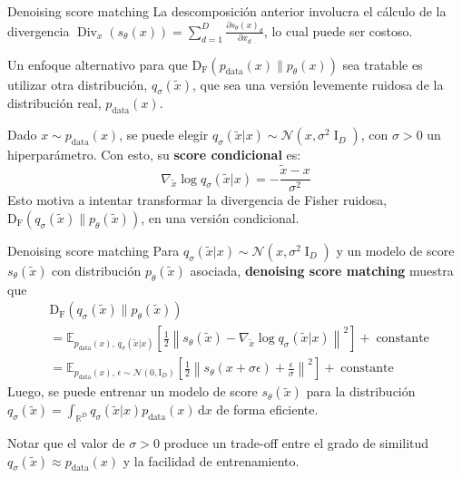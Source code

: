 \documentclass{beamer}
\newcommand{\R}{\mathbb{R}}
\begin{document}
\begin{frame}{Denoising score matching}
    La descomposición anterior involucra el cálculo de la divergencia $\operatorname{Div}_x(s_\theta(x)) = \sum_{d=1}^D \frac{\partial s_\theta(x)_d}{\partial x_d}$, lo cual puede ser costoso.

    Un enfoque alternativo para que $\operatorname{D_F}\left(p_{\text{data}}(x)\|p_\theta(x)\right)$ sea tratable es utilizar otra distribución, $q_\sigma(\tilde x)$, que sea una versión levemente ruidosa de la distribución real, $p_{\text{data}}(x)$.

    Dado $x\sim p_\text{data}(x)$, se puede elegir $q_\sigma(\tilde x| x)\sim \mathcal{N}(x,\sigma^2\operatorname{I}_D)$, con $\sigma>0$ un hiperparámetro. Con esto, su \textbf{score condicional} es:
    \begin{equation*}
        \nabla_{\tilde x} \log q_\sigma(\tilde x|x)=  -\frac{\tilde x-x}{\sigma^2}
    \end{equation*}
    Esto motiva a intentar transformar la divergencia de Fisher ruidosa, $\operatorname{D_F}\left(q_\sigma(\tilde x)\|p_\theta(\tilde x)\right)$, en una versión condicional.
\end{frame}

\begin{frame}{Denoising score matching}
    Para $q_\sigma(\tilde x| x)\sim \mathcal{N}(x,\sigma^2\operatorname{I}_D)$ y un modelo de score $s_\theta(\tilde x)$ con distribución $p_\theta(\tilde x)$ asociada, \textbf{denoising score matching} muestra que
    \begin{align*}
         & \operatorname{D_F}\left(q_\sigma(\tilde x)\|p_\theta(\tilde x)\right)                            \\
         & = \mathbb{E}_{p_{\text{data}}(x),\,q_\sigma(\tilde x|x)}\left[\frac{1}{2}\left\|
            s_\theta(\tilde x)-\nabla_{\tilde x} \log q_\sigma(\tilde x|x)
        \right\|^2\right] + \operatorname{constante}                                                        \\
         & =\mathbb{E}_{p_{\text{data}}(x),\,\epsilon\sim\mathcal{N}(0,\text{I}_D)}\left[\frac{1}{2}\left\|
            s_\theta(x+\sigma \epsilon)+\frac{\epsilon}{\sigma}
            \right\|^2\right] + \operatorname{constante}
    \end{align*}
    Luego, se puede entrenar un modelo de score $s_\theta(\tilde x)$ para la distribución $q_\sigma(\tilde x) = \int_{\R^D} q_\sigma(\tilde x|x)p_{\text{data}}(x)\,\text{d}x$ de forma eficiente.

    Notar que el valor de $\sigma>0$ produce un trade-off entre el grado de similitud $q_\sigma(\tilde x)\approx p_{\text{data}}(x)$ y la facilidad de entrenamiento.
\end{frame}
\end{document}
